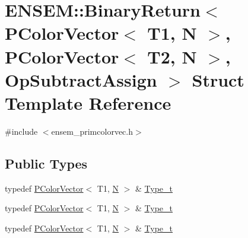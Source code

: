 \hypertarget{structENSEM_1_1BinaryReturn_3_01PColorVector_3_01T1_00_01N_01_4_00_01PColorVector_3_01T2_00_01N_01_4_00_01OpSubtractAssign_01_4}{}\section{E\+N\+S\+EM\+:\+:Binary\+Return$<$ P\+Color\+Vector$<$ T1, N $>$, P\+Color\+Vector$<$ T2, N $>$, Op\+Subtract\+Assign $>$ Struct Template Reference}
\label{structENSEM_1_1BinaryReturn_3_01PColorVector_3_01T1_00_01N_01_4_00_01PColorVector_3_01T2_00_01N_01_4_00_01OpSubtractAssign_01_4}


{\ttfamily \#include $<$ensem\+\_\+primcolorvec.\+h$>$}

\subsection*{Public Types}
\begin{DoxyCompactItemize}
\item 
typedef \mbox{\hyperlink{classENSEM_1_1PColorVector}{P\+Color\+Vector}}$<$ T1, \mbox{\hyperlink{adat__devel_2lib_2hadron_2operator__name__util_8cc_a7722c8ecbb62d99aee7ce68b1752f337}{N}} $>$ \& \mbox{\hyperlink{structENSEM_1_1BinaryReturn_3_01PColorVector_3_01T1_00_01N_01_4_00_01PColorVector_3_01T2_00_01N_01_4_00_01OpSubtractAssign_01_4_a7d35e6ce8c14bb6e40e75b5f94075018}{Type\+\_\+t}}
\item 
typedef \mbox{\hyperlink{classENSEM_1_1PColorVector}{P\+Color\+Vector}}$<$ T1, \mbox{\hyperlink{adat__devel_2lib_2hadron_2operator__name__util_8cc_a7722c8ecbb62d99aee7ce68b1752f337}{N}} $>$ \& \mbox{\hyperlink{structENSEM_1_1BinaryReturn_3_01PColorVector_3_01T1_00_01N_01_4_00_01PColorVector_3_01T2_00_01N_01_4_00_01OpSubtractAssign_01_4_a7d35e6ce8c14bb6e40e75b5f94075018}{Type\+\_\+t}}
\item 
typedef \mbox{\hyperlink{classENSEM_1_1PColorVector}{P\+Color\+Vector}}$<$ T1, \mbox{\hyperlink{adat__devel_2lib_2hadron_2operator__name__util_8cc_a7722c8ecbb62d99aee7ce68b1752f337}{N}} $>$ \& \mbox{\hyperlink{structENSEM_1_1BinaryReturn_3_01PColorVector_3_01T1_00_01N_01_4_00_01PColorVector_3_01T2_00_01N_01_4_00_01OpSubtractAssign_01_4_a7d35e6ce8c14bb6e40e75b5f94075018}{Type\+\_\+t}}
\end{DoxyCompactItemize}


